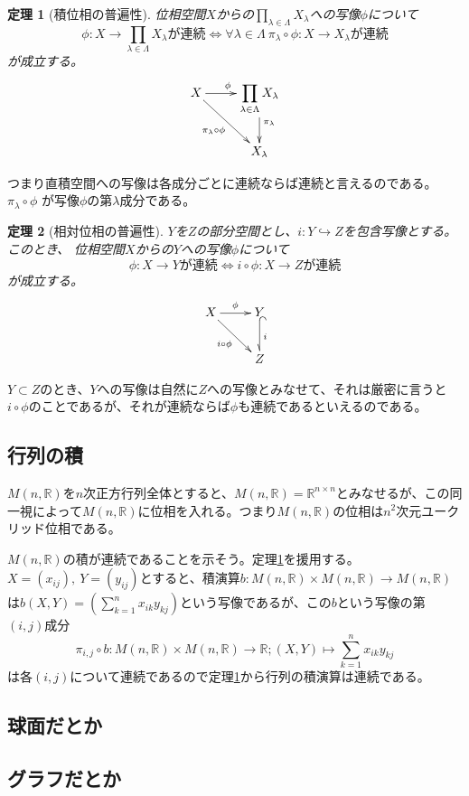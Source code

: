 \documentclass[leqno]{jsarticle}
\newtheorem{thm}{定理}
\newcommand{\rr}{\mathbb{R}}
\newcommand{\dpst}{\displaystyle}
\begin{document}
\begin{thm}[積位相の普遍性]\label{seki}
位相空間$X$からの$\dpst \prod_{\lambda \in \Lambda}X_{\lambda}$への写像$\phi$について
\[
\phi :X\rightarrow \prod_{\lambda \in \Lambda}X_{\lambda}が連続\Leftrightarrow \forall \lambda\in \Lambda\ \pi_{\lambda}\circ \phi
: X\rightarrow X_{\lambda}が連続
\]が成立する。
\[\xymatrix{
&X \ar[r]^{\phi}\ar[dr]_{\pi_{\lambda}\circ \phi}&\dpst  \prod_{\lambda \in \Lambda}X_{\lambda}\ar[d]^{\pi_{\lambda}}&\\ 
& & X_{\lambda}&
}\]
\end{thm}
つまり直積空間への写像は各成分ごとに連続ならば連続と言えるのである。$\pi_{\lambda}\circ \phi$
が写像$\phi$の第$\lambda$成分である。

\begin{thm}[相対位相の普遍性]$Y$を$Z$の部分空間とし、$i:Y\hookrightarrow Z$を包含写像とする。このとき、
位相空間$X$からの$Y$への写像$\phi$について
\[
\phi :X\rightarrow Yが連続\Leftrightarrow i\circ \phi
: X\rightarrow Zが連続
\]が成立する。
\[\xymatrix{
&X \ar[r]^{\phi}\ar[dr]_{i\circ \phi}& Y\ar@{^{(}-_>}[d]^{i}&\\ 
& & Z&
}\]

\end{thm}
$Y\subset Z$のとき、$Y$への写像は自然に$Z$への写像とみなせて、それは厳密に言うと
$i\circ \phi$のことであるが、それが連続ならば$\phi$も連続であるといえるのである。

\subsection{行列の積}
$M(n,\rr)$を$n$次正方行列全体とすると、$M(n,\rr)=\rr^{n\times n}$とみなせるが、この同一視によって$M(n,\rr)$に位相を入れる。つまり$M(n,\rr)$の位相は$n^2$次元ユークリッド位相である。
\par
$M(n,\rr)$の積が連続であることを示そう。定理\ref{seki}を援用する。$X=(x_{ij}),\ Y=(y_{ij})$とすると、積演算$b:M(n,\rr)\times M(n,\rr)\to M(n,\rr)$は$b(X,Y)=(\sum_{k=1}^nx_{ik}y_{kj})$という写像であるが、この$b$という写像の第$(i,j)$成分
\[
\pi_{i,j}\circ b:M(n,\rr)\times M(n,\rr)\to \rr;(X,Y)\mapsto \sum_{k=1}^nx_{ik}y_{kj}
\]
は各$(i,j)$について連続であるので定理\ref{seki}から行列の積演算は連続である。

\subsection{球面だとか}

\subsection{グラフだとか}
\end{document}
